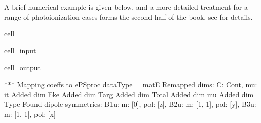 \documentclass[letterpaper,table,10pt,english]{jupyterBook}
\begin{document}
\sphinxAtStartPar
A brief numerical example is given below, and a more detailed treatment for a range of photoionization cases forms the second half of the book, see   for details.

\begin{sphinxuseclass}{cell}\begin{sphinxVerbatimInput}

\begin{sphinxuseclass}{cell_input}
\begin{sphinxVerbatim}[commandchars=\\\{\}]

   

  

  

\PYG{p}{[}\PYG{p}{]}
\end{sphinxVerbatim}

\end{sphinxuseclass}\end{sphinxVerbatimInput}
\begin{sphinxVerbatimOutput}

\begin{sphinxuseclass}{cell_output}
\begin{sphinxVerbatim}[commandchars=\\\{\}]
*** Mapping coeffs to ePSproc dataType = matE
Remapped dims: \PYGZob{}\PYGZsq{}C\PYGZsq{}: \PYGZsq{}Cont\PYGZsq{}, \PYGZsq{}mu\PYGZsq{}: \PYGZsq{}it\PYGZsq{}\PYGZcb{}
Added dim Eke
Added dim Targ
Added dim Total
Added dim mu
Added dim Type
Found dipole symmetries: 
\PYGZob{}\PYGZsq{}B1u\PYGZsq{}: \PYGZob{}\PYGZsq{}m\PYGZsq{}: [0], \PYGZsq{}pol\PYGZsq{}: [\PYGZsq{}z\PYGZsq{}]\PYGZcb{}, \PYGZsq{}B2u\PYGZsq{}: \PYGZob{}\PYGZsq{}m\PYGZsq{}: [\PYGZhy{}1, 1], \PYGZsq{}pol\PYGZsq{}: [\PYGZsq{}y\PYGZsq{}]\PYGZcb{}, \PYGZsq{}B3u\PYGZsq{}: \PYGZob{}\PYGZsq{}m\PYGZsq{}: [\PYGZhy{}1, 1], \PYGZsq{}pol\PYGZsq{}: [\PYGZsq{}x\PYGZsq{}]\PYGZcb{}\PYGZcb{}
\end{sphinxVerbatim}


\end{sphinxuseclass}
\end{sphinxVerbatimOutput}
\end{sphinxuseclass}
\end{document}
